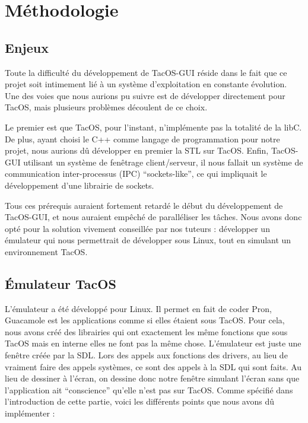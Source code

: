 \section{Méthodologie}

\subsection{Enjeux}

Toute la difficulté du développement de TacOS-GUI réside dans le fait que ce projet soit intimement lié à un système d'exploitation en constante évolution.
Une des voies que nous aurions pu suivre est de développer directement pour TacOS, mais plusieurs problèmes découlent de ce choix.

Le premier est que TacOS, pour l'instant, n'implémente pas la totalité de la libC.
De plus, ayant choisi le C++ comme langage de programmation pour notre projet, nous aurions dû développer en premier la STL sur TacOS.
Enfin, TacOS-GUI utilisant un système de fenêtrage client/serveur, il nous fallait un système de communication inter-processus (IPC) ``sockets-like'', ce qui impliquait le développement d'une librairie de sockets.

Tous ces prérequis auraient fortement retardé le début du développement de TacOS-GUI, et nous auraient empêché de paralléliser les tâches.
Nous avons donc opté pour la solution vivement conseillée par nos tuteurs : développer un émulateur qui nous permettrait de développer sous Linux, tout en simulant un environnement TacOS.

\subsection{Émulateur TacOS}

L'émulateur a été développé pour Linux.
Il permet en fait de coder Pron, Guacamole est les applications comme si elles étaient sous TacOS.
Pour cela, nous avons créé des librairies qui ont exactement les même fonctions que sous TacOS mais en interne elles ne font pas la même chose.
L'émulateur est juste une fenêtre créée par la SDL.
Lors des appels aux fonctions des drivers, au lieu de vraiment faire des appels systèmes, ce sont des appels à la SDL qui sont faits.
Au lieu de dessiner à l'écran, on dessine donc notre fenêtre simulant l'écran sans que l'application ait ``conscience'' qu'elle n'est pas sur TacOS.
Comme spécifié dans l'introduction de cette partie, voici les différents points que nous avons dû implémenter :

